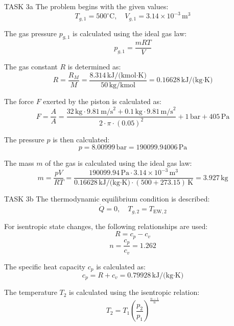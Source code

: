 TASK 3a  
The problem begins with the given values:  
\[
T_{g,1} = 500^\circ\text{C}, \quad V_{g,1} = 3.14 \times 10^{-3} \, \text{m}^3
\]  

The gas pressure \( p_{g,1} \) is calculated using the ideal gas law:  
\[
p_{g,1} = \frac{mRT}{V}
\]  

The gas constant \( R \) is determined as:  
\[
R = \frac{R_M}{M} = \frac{8.314 \, \text{kJ/(kmol·K)}}{50 \, \text{kg/kmol}} = 0.16628 \, \text{kJ/(kg·K)}
\]  

The force \( F \) exerted by the piston is calculated as:  
\[
F = \frac{A}{A} = \frac{32 \, \text{kg} \cdot 9.81 \, \text{m/s}^2 + 0.1 \, \text{kg} \cdot 9.81 \, \text{m/s}^2}{2 \cdot \pi \cdot (0.05)^2} + 1 \, \text{bar} + 405 \, \text{Pa}
\]  

The pressure \( p \) is then calculated:  
\[
p = 8.00999 \, \text{bar} = 190099.94006 \, \text{Pa}
\]  

The mass \( m \) of the gas is calculated using the ideal gas law:  
\[
m = \frac{pV}{RT} = \frac{190099.94 \, \text{Pa} \cdot 3.14 \times 10^{-3} \, \text{m}^3}{0.16628 \, \text{kJ/(kg·K)} \cdot (500 + 273.15) \, \text{K}} = 3.927 \, \text{kg}
\]  

TASK 3b  
The thermodynamic equilibrium condition is described:  
\[
\dot{Q} = 0, \quad T_{g,2} = T_{\text{EW},2}
\]  

For isentropic state changes, the following relationships are used:  
\[
R = c_p - c_v
\]  
\[
n = \frac{c_p}{c_v} = 1.262
\]  

The specific heat capacity \( c_p \) is calculated as:  
\[
c_p = R + c_v = 0.79928 \, \text{kJ/(kg·K)}
\]  

The temperature \( T_2 \) is calculated using the isentropic relation:  
\[
T_2 = T_1 \left( \frac{p_2}{p_1} \right)^{\frac{n-1}{n}}
\]